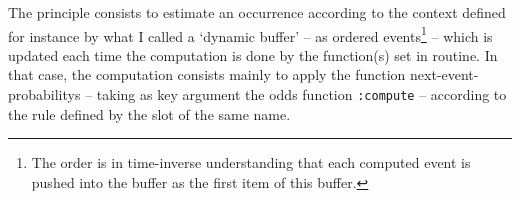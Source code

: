 The principle consists to estimate an occurrence according to the context defined for instance by what I called a `dynamic buffer' -- as ordered events\footnote{The order is in time-inverse understanding that each computed event is pushed into the buffer as the first item of this buffer.} -- which is updated each time the computation is done by the function(s) set in routine. 
In that case, the computation consists mainly to apply the function \glspl{next-event-probability} -- taking as key argument %
the odds function \texttt{:compute} %
--  according to the rule defined by the slot of the same name.  %

\bigskip

